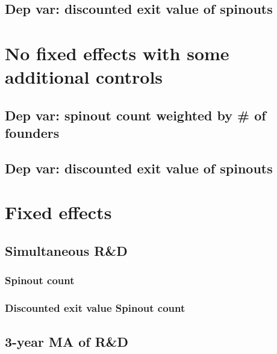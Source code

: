 \documentclass[12pt,english]{article}
\theoremstyle{remark}
\begin{document}
\subsection{Dep var: discounted exit value of spinouts}

 

\section{No fixed effects with some additional controls}

\subsection{Dep var: spinout count weighted by \# of founders}



\subsection{Dep var: discounted exit value of spinouts}



\section{Fixed effects}

\subsection{Simultaneous R\&D}

\subsubsection{Spinout count}


\linebreak



\subsubsection{Discounted exit value Spinout count}

\linebreak


\subsection{3-year MA of R\&D}
\end{document}
